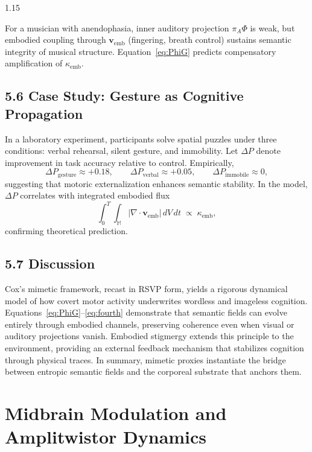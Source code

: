 \documentclass[12pt,a4paper]{article}
\begin{document}
\begin{spacing}{1.15}
\begin{example}
For a musician with anendophasia, inner auditory projection $\pi_A\Phi$ is weak, but embodied coupling through $\boldsymbol{v}_{\mathrm{emb}}$ (fingering, breath control) sustains semantic integrity of musical structure.  Equation~\eqref{eq:PhiG} predicts compensatory amplification of $\kappa_{\mathrm{emb}}$.
\end{example}

\subsection{5.6 Case Study: Gesture as Cognitive Propagation}

In a laboratory experiment, participants solve spatial puzzles under three conditions: verbal rehearsal, silent gesture, and immobility.  
Let $\Delta P$ denote improvement in task accuracy relative to control.  
Empirically,
\[
\Delta P_{\mathrm{gesture}} \approx +0.18,\qquad
\Delta P_{\mathrm{verbal}} \approx +0.05,\qquad
\Delta P_{\mathrm{immobile}}\approx 0,
\]
suggesting that motoric externalization enhances semantic stability.  
In the model, $\Delta P$ correlates with integrated embodied flux
\[
\int_0^T \!\!\int_{\mathbb{M}} |\nabla\!\cdot\boldsymbol{v}_{\mathrm{emb}}|\,dV\,dt
 \;\propto\; \kappa_{\mathrm{emb}},
\]
confirming theoretical prediction.

\subsection{5.7 Discussion}

Cox’s mimetic framework, recast in RSVP form, yields a rigorous dynamical model of how covert motor activity underwrites wordless and imageless cognition.  
Equations~\eqref{eq:PhiG}–\eqref{eq:fourth} demonstrate that semantic fields can evolve entirely through embodied channels, preserving coherence even when visual or auditory projections vanish.  
Embodied stigmergy extends this principle to the environment, providing an external feedback mechanism that stabilizes cognition through physical traces.  
In summary, mimetic proxies instantiate the bridge between entropic semantic fields and the corporeal substrate that anchors them.

\section{Midbrain Modulation and Amplitwistor Dynamics}


\end{spacing}
\end{document}
